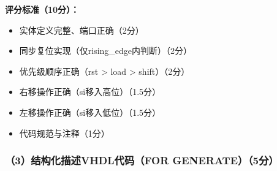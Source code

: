 \textbf{评分标准（10分）：}
\begin{itemize}
  \item 实体定义完整、端口正确\hfill（2分）
  \item 同步复位实现（仅rising\_edge内判断）\hfill（2分）
  \item 优先级顺序正确（rst > load > shift）\hfill（2分）
  \item 右移操作正确（si移入高位）\hfill（1.5分）
  \item 左移操作正确（si移入低位）\hfill（1.5分）
  \item 代码规范与注释\hfill（1分）
\end{itemize}

\subsubsection*{（3）结构化描述VHDL代码（FOR GENERATE）（5分）}

